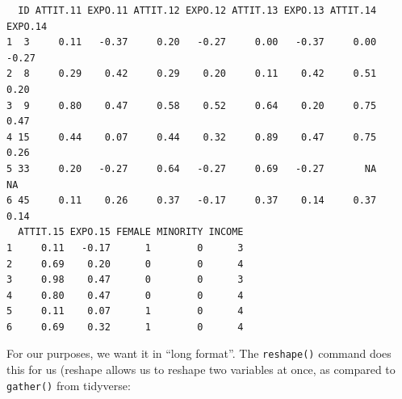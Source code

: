 \documentclass[
  letterpaper,
  DIV=11,
  numbers=noendperiod]{scrreprt}
\newenvironment{Shaded}{\begin{snugshade}}{\end{snugshade}}
\newcommand{\AttributeTok}[1]{\textcolor[rgb]{0.49,0.56,0.16}{#1}}
\newcommand{\CommentTok}[1]{\textcolor[rgb]{0.38,0.63,0.69}{\textit{#1}}}
\newcommand{\DecValTok}[1]{\textcolor[rgb]{0.25,0.63,0.44}{#1}}
\newcommand{\DocumentationTok}[1]{\textcolor[rgb]{0.73,0.13,0.13}{\textit{#1}}}
\newcommand{\FunctionTok}[1]{\textcolor[rgb]{0.02,0.16,0.49}{#1}}
\newcommand{\NormalTok}[1]{\textcolor[rgb]{0.00,0.44,0.13}{#1}}
\newcommand{\OtherTok}[1]{\textcolor[rgb]{0.00,0.44,0.13}{#1}}
\newcommand{\SpecialCharTok}[1]{\textcolor[rgb]{0.25,0.44,0.63}{#1}}
\newcommand{\StringTok}[1]{\textcolor[rgb]{0.25,0.44,0.63}{#1}}
\begin{document}
\begin{verbatim}
  ID ATTIT.11 EXPO.11 ATTIT.12 EXPO.12 ATTIT.13 EXPO.13 ATTIT.14 EXPO.14
1  3     0.11   -0.37     0.20   -0.27     0.00   -0.37     0.00   -0.27
2  8     0.29    0.42     0.29    0.20     0.11    0.42     0.51    0.20
3  9     0.80    0.47     0.58    0.52     0.64    0.20     0.75    0.47
4 15     0.44    0.07     0.44    0.32     0.89    0.47     0.75    0.26
5 33     0.20   -0.27     0.64   -0.27     0.69   -0.27       NA      NA
6 45     0.11    0.26     0.37   -0.17     0.37    0.14     0.37    0.14
  ATTIT.15 EXPO.15 FEMALE MINORITY INCOME
1     0.11   -0.17      1        0      3
2     0.69    0.20      0        0      4
3     0.98    0.47      0        0      3
4     0.80    0.47      0        0      4
5     0.11    0.07      1        0      4
6     0.69    0.32      1        0      4
\end{verbatim}

For our purposes, we want it in ``long format''. The \texttt{reshape()}
command does this for us (reshape allows us to reshape two variables at
once, as compared to \texttt{gather()} from tidyverse:

\begin{Shaded}
\end{Shaded}
\end{document}
